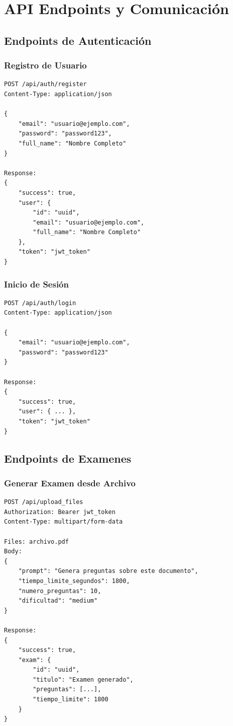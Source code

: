 \documentclass[12pt,a4paper]{report}
\begin{document}
\chapter{API Endpoints y Comunicación}

\section{Endpoints de Autenticación}

\subsection{Registro de Usuario}
\begin{lstlisting}
POST /api/auth/register
Content-Type: application/json

{
    "email": "usuario@ejemplo.com",
    "password": "password123",
    "full_name": "Nombre Completo"
}

Response:
{
    "success": true,
    "user": {
        "id": "uuid",
        "email": "usuario@ejemplo.com",
        "full_name": "Nombre Completo"
    },
    "token": "jwt_token"
}
\end{lstlisting}

\subsection{Inicio de Sesión}
\begin{lstlisting}
POST /api/auth/login
Content-Type: application/json

{
    "email": "usuario@ejemplo.com",
    "password": "password123"
}

Response:
{
    "success": true,
    "user": { ... },
    "token": "jwt_token"
}
\end{lstlisting}

\section{Endpoints de Examenes}

\subsection{Generar Examen desde Archivo}
\begin{lstlisting}
POST /api/upload_files
Authorization: Bearer jwt_token
Content-Type: multipart/form-data

Files: archivo.pdf
Body:
{
    "prompt": "Genera preguntas sobre este documento",
    "tiempo_limite_segundos": 1800,
    "numero_preguntas": 10,
    "dificultad": "medium"
}

Response:
{
    "success": true,
    "exam": {
        "id": "uuid",
        "titulo": "Examen generado",
        "preguntas": [...],
        "tiempo_limite": 1800
    }
}
\end{lstlisting}
\end{document}
